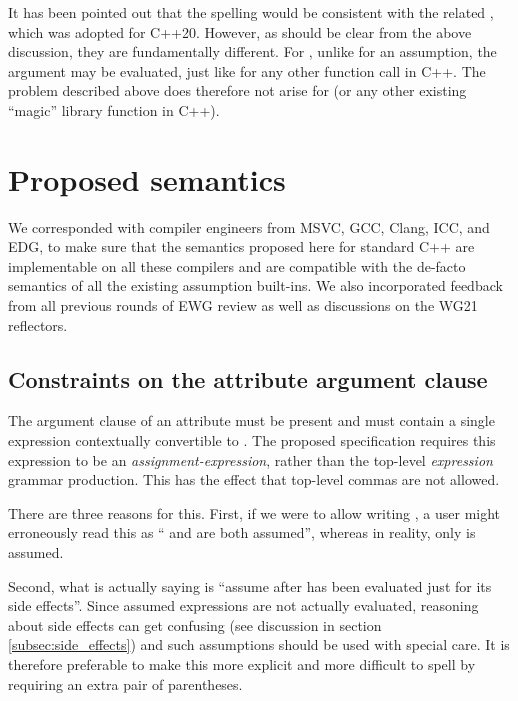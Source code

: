 It has been pointed out that the spelling  would be consistent with the related , which was adopted for C++20. However, as should be clear from the above discussion, they are fundamentally different. For ,  unlike for an assumption, the argument may be evaluated, just like for any other function call in C++. The problem described above does therefore not arise for  (or any other existing ``magic'' library function in C++).



\section{Proposed semantics}
\label{sec:semantics}

We corresponded with compiler engineers from MSVC, GCC, Clang, ICC, and EDG, to make sure that the semantics proposed here for standard C++ are implementable on all these compilers and are compatible with the de-facto semantics of all the existing assumption built-ins. We also incorporated feedback from all previous rounds of EWG review as well as discussions on the WG21 reflectors.

\subsection{Constraints on the attribute argument clause}

The argument clause of an  attribute must be present and must contain a single expression contextually convertible to . The proposed specification requires this expression to be an \emph{assignment-expression}, rather than the top-level \emph{expression} grammar production. This has the effect that top-level commas are not allowed.

There are three reasons for this. First, if we were to allow writing , a user might erroneously read this as `` and  are both assumed'', whereas in reality, only  is assumed.

Second, what  is actually saying is ``assume  after  has been evaluated just for its side effects''. Since assumed expressions are not actually evaluated, reasoning about side effects can get confusing (see discussion in section \ref{subsec:side_effects}) and such assumptions should be used with special care. It is therefore preferable to make this more explicit and more difficult to spell by requiring an extra pair of parentheses.

